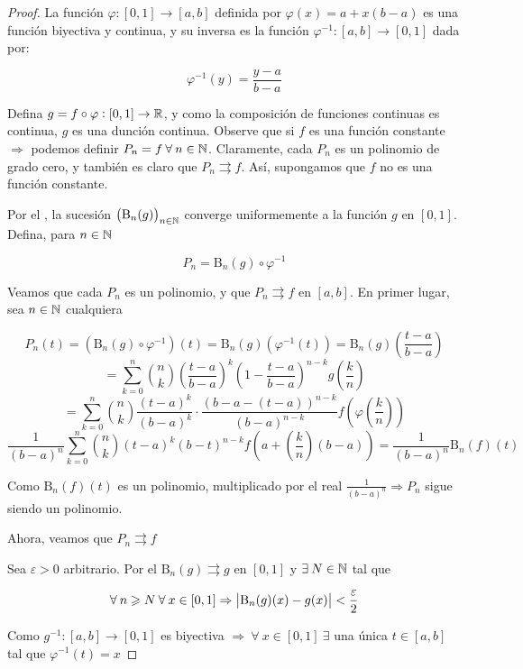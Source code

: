 \begin{proof}
    La función $\varphi : [0,1] \to [a,b]$ definida por $\varphi(x) = a + x(b-a)$ es una función biyectiva y continua, y su inversa es la función ${\varphi}^{-1} : [a,b] \to [0,1]$ dada por:

    $${\varphi}^{-1} (y) = \frac{y-a}{b-a}$$

    Defina $g = f \circ \varphi : [0,1] \to \mathbb{R}$, y como la composición de funciones continuas es continua, $g$ es una dunción continua. Observe que si $f$ es una función constante $\Rightarrow$ podemos definir $P_n = f \: \forall \: n \in \mathbb{N}$. Claramente, cada $P_n$ es un polinomio de grado cero, y también es claro que $P_n \rightrightarrows f$. Así, supongamos que $f$ no es una función constante.


    Por el , la sucesión ${\left(\mathrm{B}_n(g)\right)}_{n \in \mathbb{N}}$ converge uniformemente a la función $g$ en $[0,1]$. Defina, para $n \in \mathbb{N}$

    $$P_n = \mathrm{B}_n(g) \circ {\varphi}^{-1}$$

    Veamos que cada $P_n$ es un polinomio, y que $P_n \rightrightarrows f$ en $[a,b]$. En primer lugar, sea $n \in \mathbb{N}$ cualquiera

    $$P_n(t) = (\mathrm{B}_n(g) \circ {\varphi}^{-1})(t) = \mathrm{B}_n(g) ({\varphi}^{-1}(t)) = \mathrm{B}_n(g)  \left( \frac{t-a}{b-a}\right)$$
    $$= \sum_{k=0}^{n} \binom{n}{k} {\left( \frac{t-a}{b-a}\right)}^{k}{\left( 1-\frac{t-a}{b-a}\right)}^{n-k} g\left( \frac{k}{n} \right) $$
    $$= \sum_{k=0}^{n} \binom{n}{k} \frac{{(t-a)}^{k}}{{(b-a)}^{k}} \cdot \frac{{(b-a-(t-a))}^{n-k}}{{(b-a)}^{n-k}} f\left(\varphi \left( \frac{k}{n} \right) \right)$$
    $$\frac{1}{{(b-a)}^{n}} \sum_{k=0}^{n} \binom{n}{k} {(t-a)}^{k}{(b-t)}^{n-k} f \left( a + \left(\frac{k}{n} \right)(b-a) \right) = \frac{1}{{(b-a)}^{n}} \mathrm{B}_n(f)(t) $$

    Como $\mathrm{B}_n(f)(t)$ es un polinomio, multiplicado por el real $\frac{1}{{(b-a)}^{n}} \Rightarrow P_n$ sigue siendo un polinomio.

    Ahora, veamos que $P_n \rightrightarrows f$

    Sea $\varepsilon > 0$ arbitrario. Por el  $\mathrm{B}_n(g) \rightrightarrows g$ en $[0,1]$ y $\exists \: N \in \mathbb{N}$ tal que

    $$\forall \: n \geqslant N \: \forall \: x \in [0,1] \Rightarrow \abs{\mathrm{B}_n(g)(x)-g(x)} < \frac{\varepsilon}{2}$$

    Como $g^{-1} : [a,b] \to [0,1]$ es biyectiva $\Rightarrow \: \forall \: x \in [0,1] \: \exists$ una única $t \in [a,b]$ tal que ${\varphi}^{-1} (t) = x$


\end{proof}
